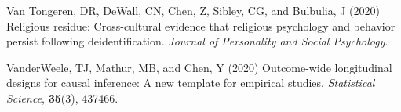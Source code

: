 \documentclass[
  singlecolumn]{article}
\newlength{\cslhangindent}
\newlength{\cslentryspacingunit} %
\newenvironment{CSLReferences}[2] %
 {%
  \setlength{\parindent}{0pt}
  \ifodd #1
  \let\oldpar\par
  \def\par{\hangindent=\cslhangindent\oldpar}
  \fi
  \setlength{\parskip}{#2\cslentryspacingunit}
 }%
 {}
\begin{document}
\begin{CSLReferences}{1}{0}
\leavevmode{}%
Van Tongeren, DR, DeWall, CN, Chen, Z, Sibley, CG, and Bulbulia, J
(2020) Religious residue: Cross-cultural evidence that religious
psychology and behavior persist following deidentification.
\emph{Journal of Personality and Social Psychology}.

\leavevmode{}%
VanderWeele, TJ, Mathur, MB, and Chen, Y (2020) Outcome-wide
longitudinal designs for causal inference: A new template for empirical
studies. \emph{Statistical Science}, \textbf{35}(3), 437466.

\end{CSLReferences}
\end{document}
